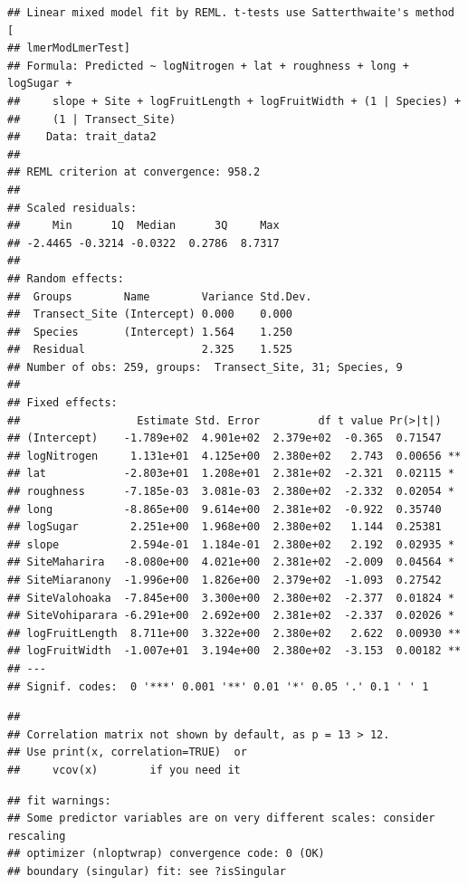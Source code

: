 \documentclass[
  12pt,
]{article}
\begin{document}
\begin{verbatim}
## Linear mixed model fit by REML. t-tests use Satterthwaite's method [
## lmerModLmerTest]
## Formula: Predicted ~ logNitrogen + lat + roughness + long + logSugar +  
##     slope + Site + logFruitLength + logFruitWidth + (1 | Species) +  
##     (1 | Transect_Site)
##    Data: trait_data2
## 
## REML criterion at convergence: 958.2
## 
## Scaled residuals: 
##     Min      1Q  Median      3Q     Max 
## -2.4465 -0.3214 -0.0322  0.2786  8.7317 
## 
## Random effects:
##  Groups        Name        Variance Std.Dev.
##  Transect_Site (Intercept) 0.000    0.000   
##  Species       (Intercept) 1.564    1.250   
##  Residual                  2.325    1.525   
## Number of obs: 259, groups:  Transect_Site, 31; Species, 9
## 
## Fixed effects:
##                  Estimate Std. Error         df t value Pr(>|t|)   
## (Intercept)    -1.789e+02  4.901e+02  2.379e+02  -0.365  0.71547   
## logNitrogen     1.131e+01  4.125e+00  2.380e+02   2.743  0.00656 **
## lat            -2.803e+01  1.208e+01  2.381e+02  -2.321  0.02115 * 
## roughness      -7.185e-03  3.081e-03  2.380e+02  -2.332  0.02054 * 
## long           -8.865e+00  9.614e+00  2.381e+02  -0.922  0.35740   
## logSugar        2.251e+00  1.968e+00  2.380e+02   1.144  0.25381   
## slope           2.594e-01  1.184e-01  2.380e+02   2.192  0.02935 * 
## SiteMaharira   -8.080e+00  4.021e+00  2.381e+02  -2.009  0.04564 * 
## SiteMiaranony  -1.996e+00  1.826e+00  2.379e+02  -1.093  0.27542   
## SiteValohoaka  -7.845e+00  3.300e+00  2.380e+02  -2.377  0.01824 * 
## SiteVohiparara -6.291e+00  2.692e+00  2.381e+02  -2.337  0.02026 * 
## logFruitLength  8.711e+00  3.322e+00  2.380e+02   2.622  0.00930 **
## logFruitWidth  -1.007e+01  3.194e+00  2.380e+02  -3.153  0.00182 **
## ---
## Signif. codes:  0 '***' 0.001 '**' 0.01 '*' 0.05 '.' 0.1 ' ' 1
\end{verbatim}

\begin{verbatim}
## 
## Correlation matrix not shown by default, as p = 13 > 12.
## Use print(x, correlation=TRUE)  or
##     vcov(x)        if you need it
\end{verbatim}

\begin{verbatim}
## fit warnings:
## Some predictor variables are on very different scales: consider rescaling
## optimizer (nloptwrap) convergence code: 0 (OK)
## boundary (singular) fit: see ?isSingular
\end{verbatim}
\end{document}
